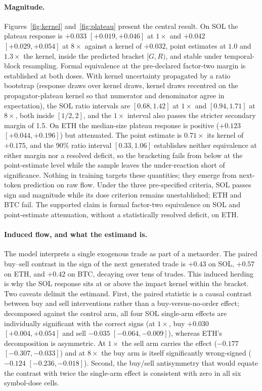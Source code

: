 \documentclass[sigconf,anonymous]{acmart}
\begin{document}
\paragraph{Magnitude.} Figures~\ref{fig:kernel} and~\ref{fig:plateau} present the central result. On SOL the plateau response is $+0.033$ $[+0.019, +0.046]$ at $1\times$ and $+0.042$ $[+0.029, +0.054]$ at $8\times$ against a kernel of $+0.032$, point estimates at $1.0$ and $1.3\times$ the kernel, inside the predicted bracket $[G, R)$, and stable under temporal-block resampling. Formal equivalence at the pre-declared factor-two margin is established at both doses. With kernel uncertainty propagated by a ratio bootstrap (response draws over kernel draws, kernel draws recentred on the propagator-plateau kernel so that numerator and denominator agree in expectation), the SOL ratio intervals are $[0.68, 1.42]$ at $1\times$ and $[0.94, 1.71]$ at $8\times$, both inside $[1/2, 2]$, and the $1\times$ interval also passes the stricter secondary margin of 1.5. On ETH the median-size plateau response is positive ($+0.123$ $[+0.044, +0.196]$) but attenuated. The point estimate is $0.71\times$ its kernel of $+0.175$, and the 90\% ratio interval $[0.33, 1.06]$ establishes neither equivalence at either margin nor a resolved deficit, so the bracketing fails from below at the point-estimate level while the sample leaves the under-reaction short of significance. Nothing in training targets these quantities; they emerge from next-token prediction on raw flow. Under the three pre-specified criteria, SOL passes sign and magnitude while its dose criterion remains unestablished; ETH and BTC fail. The supported claim is formal factor-two equivalence on SOL and point-estimate attenuation, without a statistically resolved deficit, on ETH.

\paragraph{Induced flow, and what the estimand is.} The model interprets a single exogenous trade as part of a metaorder. The paired buy--sell contrast in the sign of the next generated trade is $+0.43$ on SOL, $+0.57$ on ETH, and $+0.42$ on BTC, decaying over tens of trades. This induced herding is why the SOL response sits at or above the impact kernel within the bracket. Two caveats delimit the estimand. First, the paired statistic is a causal contrast between buy and sell interventions rather than a buy-versus-no-order effect; decomposed against the control arm, all four SOL single-arm effects are individually significant with the correct signs (at $1\times$, buy $+0.030$ $[+0.004, +0.054]$ and sell $-0.035$ $[-0.064, -0.009]$), whereas ETH's decomposition is asymmetric. At $1\times$ the sell arm carries the effect ($-0.177$ $[-0.307, -0.033]$) and at $8\times$ the buy arm is itself significantly wrong-signed ($-0.124$ $[-0.236, -0.018]$). Second, the buy/sell antisymmetry that would equate the contrast with twice the single-arm effect is consistent with zero in all six symbol-dose cells.
\end{document}
